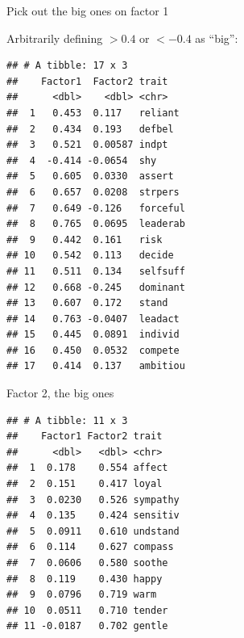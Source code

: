 \documentclass[
  ignorenonframetext,
]{beamer}
\newenvironment{Shaded}{\begin{snugshade}}{\end{snugshade}}
\newcommand{\FloatTok}[1]{\textcolor[rgb]{0.00,0.00,0.81}{#1}}
\newcommand{\KeywordTok}[1]{\textcolor[rgb]{0.13,0.29,0.53}{\textbf{#1}}}
\newcommand{\NormalTok}[1]{#1}
\newcommand{\OperatorTok}[1]{\textcolor[rgb]{0.81,0.36,0.00}{\textbf{#1}}}
\newcommand{\StringTok}[1]{\textcolor[rgb]{0.31,0.60,0.02}{#1}}
\begin{document}
\begin{frame}[fragile]{Pick out the big ones on factor 1}
\protect\hypertarget{pick-out-the-big-ones-on-factor-1}{}

Arbitrarily defining \(>0.4\) or \(<-0.4\) as ``big'':

\scriptsize

\begin{Shaded}
\end{Shaded}

\begin{verbatim}
## # A tibble: 17 x 3
##    Factor1  Factor2 trait   
##      <dbl>    <dbl> <chr>   
##  1   0.453  0.117   reliant 
##  2   0.434  0.193   defbel  
##  3   0.521  0.00587 indpt   
##  4  -0.414 -0.0654  shy     
##  5   0.605  0.0330  assert  
##  6   0.657  0.0208  strpers 
##  7   0.649 -0.126   forceful
##  8   0.765  0.0695  leaderab
##  9   0.442  0.161   risk    
## 10   0.542  0.113   decide  
## 11   0.511  0.134   selfsuff
## 12   0.668 -0.245   dominant
## 13   0.607  0.172   stand   
## 14   0.763 -0.0407  leadact 
## 15   0.445  0.0891  individ 
## 16   0.450  0.0532  compete 
## 17   0.414  0.137   ambitiou
\end{verbatim}

\normalsize

\end{frame}

\begin{frame}[fragile]{Factor 2, the big ones}
\protect\hypertarget{factor-2-the-big-ones}{}

\footnotesize

\begin{Shaded}
\end{Shaded}

\begin{verbatim}
## # A tibble: 11 x 3
##    Factor1 Factor2 trait   
##      <dbl>   <dbl> <chr>   
##  1  0.178    0.554 affect  
##  2  0.151    0.417 loyal   
##  3  0.0230   0.526 sympathy
##  4  0.135    0.424 sensitiv
##  5  0.0911   0.610 undstand
##  6  0.114    0.627 compass 
##  7  0.0606   0.580 soothe  
##  8  0.119    0.430 happy   
##  9  0.0796   0.719 warm    
## 10  0.0511   0.710 tender  
## 11 -0.0187   0.702 gentle
\end{verbatim}

\normalsize

\end{frame}
\end{document}
